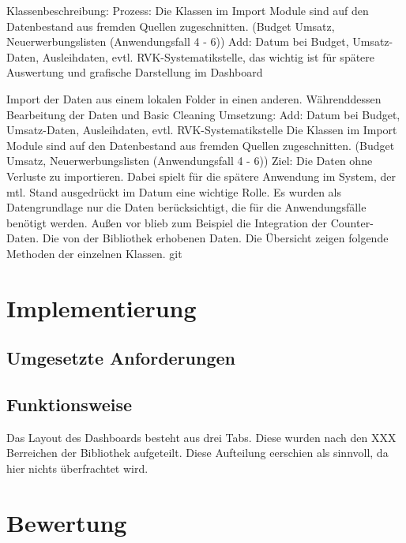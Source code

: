     Klassenbeschreibung:
    Prozess: Die Klassen im Import Module sind auf den Datenbestand aus fremden Quellen zugeschnitten.
    (Budget Umsatz, Neuerwerbungslisten (Anwendungsfall 4 - 6))
    Add: Datum bei Budget, Umsatz-Daten, Ausleihdaten, evtl. RVK-Systematikstelle, das wichtig ist für spätere Auswertung und grafische Darstellung
    im Dashboard
    
    
 
    
    
    Import der Daten aus einem lokalen Folder in einen anderen. 
    Währenddessen Bearbeitung der Daten und Basic Cleaning
    Umsetzung:
    Add: Datum bei Budget, Umsatz-Daten, Ausleihdaten, evtl. RVK-Systematikstelle 
    Die Klassen im Import Module sind auf den Datenbestand aus fremden Quellen zugeschnitten.
    (Budget Umsatz, Neuerwerbungslisten (Anwendungsfall 4 - 6))
    Ziel: Die Daten ohne Verluste zu importieren. Dabei spielt für die spätere Anwendung im System, der mtl. Stand
    ausgedrückt im Datum eine wichtige Rolle.
    Es wurden als Datengrundlage nur die Daten berücksichtigt, die für die Anwendungsfälle benötigt werden.
    Außen vor blieb zum Beispiel die Integration der Counter-Daten.
    Die von der Bibliothek erhobenen Daten. Die Übersicht zeigen folgende Methoden der einzelnen Klassen.
    git
    
    
    

\section{Implementierung}
    \subsection{Umgesetzte Anforderungen}
    \subsection{Funktionsweise}
    Das Layout des Dashboards besteht aus drei Tabs. Diese wurden nach den XXX Berreichen der Bibliothek aufgeteilt. Diese Aufteilung eerschien als sinnvoll,
    da hier nichts überfrachtet wird.

\section{Bewertung}

